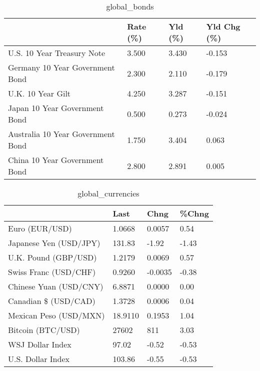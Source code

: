 \documentclass{article}%
\begin{document}
%


\begin{table}[htbp]%
\caption{global\_bonds}%
\centering%
\begin{adjustbox}{width=1\textwidth}%
\begin{tabular}{llll}
\toprule
                                  & Rate (\%) & Yld (\%) & Yld Chg (\%) \\
\midrule
       U.S. 10 Year Treasury Note &    3.500 &   3.430 &      -0.153 \\
  Germany 10 Year Government Bond &    2.300 &   2.110 &      -0.179 \\
                U.K. 10 Year Gilt &    4.250 &   3.287 &      -0.151 \\
    Japan 10 Year Government Bond &    0.500 &   0.273 &      -0.024 \\
Australia 10 Year Government Bond &    1.750 &   3.404 &       0.063 \\
    China 10 Year Government Bond &    2.800 &   2.891 &       0.005 \\
\bottomrule
\end{tabular}
%
\end{adjustbox}%
\end{table}

%


\begin{table}[htbp]%
\caption{global\_currencies}%
\centering%
\begin{adjustbox}{width=1\textwidth}%
\begin{tabular}{llll}
\toprule
                       &    Last &    Chng & \%Chng \\
\midrule
        Euro (EUR/USD) &  1.0668 &  0.0057 &  0.54 \\
Japanese Yen (USD/JPY) &  131.83 &   -1.92 & -1.43 \\
  U.K. Pound (GBP/USD) &  1.2179 &  0.0069 &  0.57 \\
 Swiss Franc (USD/CHF) &  0.9260 & -0.0035 & -0.38 \\
Chinese Yuan (USD/CNY) &  6.8871 &  0.0000 &  0.00 \\
  Canadian \$ (USD/CAD) &  1.3728 &  0.0006 &  0.04 \\
Mexican Peso (USD/MXN) & 18.9110 &  0.1953 &  1.04 \\
     Bitcoin (BTC/USD) &   27602 &     811 &  3.03 \\
      WSJ Dollar Index &   97.02 &   -0.52 & -0.53 \\
     U.S. Dollar Index &  103.86 &   -0.55 & -0.53 \\
\bottomrule
\end{tabular}
%
\end{adjustbox}%
\end{table}
\end{document}
